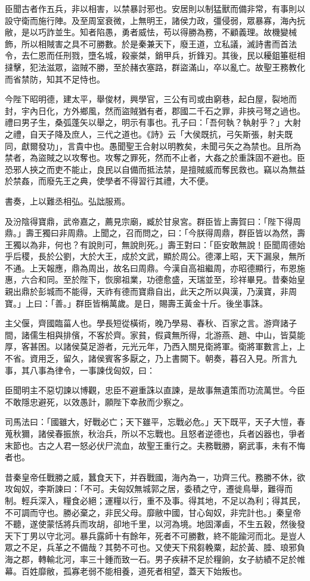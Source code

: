 \begin{pinyinscope}
臣聞古者作五兵，非以相害，以禁暴討邪也。安居則以制猛獸而備非常，有事則以設守衛而施行陣。及至周室衰微，上無明王，諸侯力政，彊侵弱，眾暴寡，海內抏敝，是以巧詐並生。知者陷愚，勇者威怯，苟以得勝為務，不顧義理。故機變械飾，所以相賊害之具不可勝數。於是秦兼天下，廢王道，立私議，滅詩書而首法令，去仁恩而任刑戮，墮名城，殺豪桀，銷甲兵，折鋒刃。其後，民以耰鉏箠梃相撻擊，犯法滋眾，盜賊不勝，至於赭衣塞路，群盜滿山，卒以亂亡。故聖王務教化而省禁防，知其不足恃也。

今陛下昭明德，建太平，舉俊材，興學官，三公有司或由窮巷，起白屋，裂地而封，宇內日化，方外鄉風，然而盜賊猶有者，郡國二千石之罪，非挾弓弩之過也。禮曰男子生，桑弧蓬矢以舉之，明示有事也。孔子曰：「吾何執？執射乎？」大射之禮，自天子降及庶人，三代之道也。《詩》云「大侯既抗，弓矢斯張，射夫既同，獻爾發功」，言貴中也。愚聞聖王合射以明教矣，未聞弓矢之為禁也。且所為禁者，為盜賊之以攻奪也。攻奪之罪死，然而不止者，大姦之於重誅固不避也。臣恐邪人挾之而吏不能止，良民以自備而抵法禁，是擅賊威而奪民救也。竊以為無益於禁姦，而廢先王之典，使學者不得習行其禮，大不便。

書奏，上以難丞相弘。弘詘服焉。

及汾陰得寶鼎，武帝嘉之，薦見宗廟，臧於甘泉宮。群臣皆上壽賀曰：「陛下得周鼎。」壽王獨曰非周鼎。上聞之，召而問之，曰：「今朕得周鼎，群臣皆以為然，壽王獨以為非，何也？有說則可，無說則死。」壽王對曰：「臣安敢無說！臣聞周德始乎后稷，長於公劉，大於大王，成於文武，顯於周公。德澤上昭，天下漏泉，無所不通。上天報應，鼎為周出，故名曰周鼎。今漢自高祖繼周，亦昭德顯行，布恩施惠，六合和同。至於陛下，恢廓祖業，功德愈盛，天瑞並至，珍祥畢見。昔秦始皇親出鼎於彭城而不能得，天祚有德而寶鼎自出，此天之所以與漢，乃漢寶，非周寶。」上曰：「善。」群臣皆稱萬歲。是日，賜壽王黃金十斤。後坐事誅。

主父偃，齊國臨菑人也。學長短從橫術，晚乃學易、春秋、百家之言。游齊諸子間，諸儒生相與排儐，不客於齊。家貧，假貣無所得，北游燕、趙、中山，皆莫能厚，客甚困。以諸侯莫足游者，元光元年，乃西入關見衛將軍。衛將軍數言上，上不省。資用乏，留久，諸侯賓客多厭之，乃上書闕下。朝奏，暮召入見。所言九事，其八事為律令，一事諫伐匈奴，曰：

臣聞明主不惡切諫以博觀，忠臣不避重誅以直諫，是故事無遺策而功流萬世。今臣不敢隱忠避死，以效愚計，願陛下幸赦而少察之。

司馬法曰：「國雖大，好戰必亡；天下雖平，忘戰必危。」天下既平，天子大愷，春蒐秋獮，諸侯春振旅，秋治兵，所以不忘戰也。且怒者逆德也，兵者凶器也，爭者末節也。古之人君一怒必伏尸流血，故聖王重行之。夫務戰勝，窮武事，未有不悔者也。

昔秦皇帝任戰勝之威，蠶食天下，并吞戰國，海內為一，功齊三代。務勝不休，欲攻匈奴，李斯諫曰：「不可。夫匈奴無城郭之居，委積之守，遷徙鳥舉，難得而制。輕兵深入，糧食必絕；運糧以行，重不及事。得其地，不足以為利；得其民，不可調而守也。勝必棄之，非民父母。靡敝中國，甘心匈奴，非完計也。」秦皇帝不聽，遂使蒙恬將兵而攻胡，卻地千里，以河為境。地固澤鹵，不生五穀，然後發天下丁男以守北河。暴兵露師十有餘年，死者不可勝數，終不能踰河而北。是豈人眾之不足，兵革之不備哉？其勢不可也。又使天下飛芻輓粟，起於黃、腄、琅邪負海之郡，轉輸北河，率三十鍾而致一石。男子疾耕不足於糧餉，女子紡績不足於帷幕。百姓靡敝，孤寡老弱不能相養，道死者相望，蓋天下始叛也。


\end{pinyinscope}
